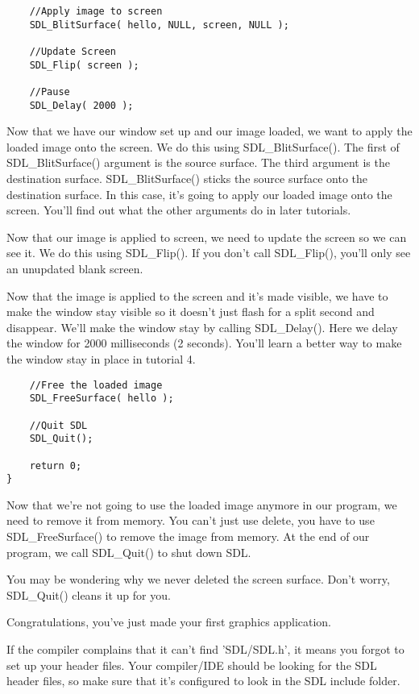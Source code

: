 \begin{verbatim}
    //Apply image to screen
    SDL_BlitSurface( hello, NULL, screen, NULL );

    //Update Screen
    SDL_Flip( screen );

    //Pause
    SDL_Delay( 2000 );
\end{verbatim}

Now that we have our window set up and our image loaded, we want to apply the
loaded image onto the screen. We do this using SDL\_BlitSurface(). The first of
SDL\_BlitSurface() argument is the source surface. The third argument is the
destination surface. SDL\_BlitSurface() sticks the source surface onto the
destination surface. In this case, it's going to apply our loaded image onto the
screen. You'll find out what the other arguments do in later tutorials.

Now that our image is applied to screen, we need to update the screen so we can
see it. We do this using SDL\_Flip(). If you don't call SDL\_Flip(), you'll only
see an unupdated blank screen.

Now that the image is applied to the screen and it's made visible, we have to
make the window stay visible so it doesn't just flash for a split second and
disappear. We'll make the window stay by calling SDL\_Delay(). Here we delay the
window for 2000 milliseconds (2 seconds). You'll learn a better way to make the
window stay in place in tutorial 4.

\begin{verbatim}
    //Free the loaded image
    SDL_FreeSurface( hello );

    //Quit SDL
    SDL_Quit();

    return 0;
}
\end{verbatim}

Now that we're not going to use the loaded image anymore in our program, we need
to remove it from memory. You can't just use delete, you have to use
SDL\_FreeSurface() to remove the image from memory. At the end of our program,
we call SDL\_Quit() to shut down SDL.

You may be wondering why we never deleted the screen surface. Don't worry,
SDL\_Quit() cleans it up for you.

Congratulations, you've just made your first graphics application.


If the compiler complains that it can't find 'SDL/SDL.h', it means you forgot to
set up your header files. Your compiler/IDE should be looking for the SDL header
files, so make sure that it's configured to look in the SDL include folder.

